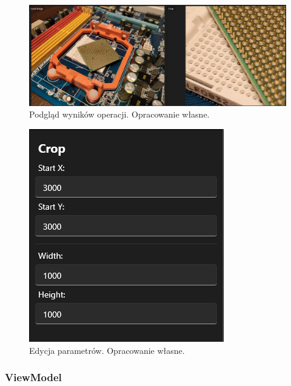 \begin{figure}[H]
    \centering
    \includegraphics[width=1\linewidth]{images/Picture16.png}
    \caption{Podgląd wyników operacji. Opracowanie własne.}
    \label{fig:preview}
\end{figure}

\begin{figure}[H]
    \centering
    \includegraphics[width=0.6\linewidth]{images/Picture17.png}
    \caption{Edycja parametrów. Opracowanie własne.}
    \label{fig:params}
\end{figure}
\subsubsection{ViewModel}
